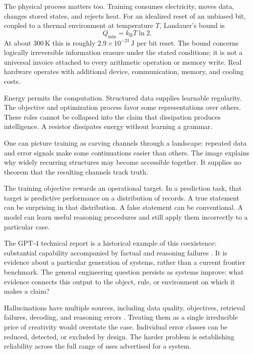The physical process matters too. Training consumes electricity, moves data, changes stored states, and rejects heat. For an idealized reset of an unbiased bit, coupled to a thermal environment at temperature $T$, Landauer's bound is
\begin{equation}
 Q_{\min}=k_{\mathrm B}T\ln 2.
\end{equation}
At about $300\,\mathrm{K}$ this is roughly $2.9\times10^{-21}\,\mathrm{J}$ per bit reset. The bound concerns logically irreversible information erasure under the stated conditions; it is not a universal invoice attached to every arithmetic operation or memory write. Real hardware operates with additional device, communication, memory, and cooling costs.

Energy permits the computation. Structured data supplies learnable regularity. The objective and optimization process favor some representations over others. These roles cannot be collapsed into the claim that dissipation produces intelligence. A resistor dissipates energy without learning a grammar.

One can picture training as carving channels through a landscape: repeated data and error signals make some continuations easier than others. The image explains why widely recurring structures may become accessible together. It supplies no theorem that the resulting channels track truth.

The training objective rewards an operational target. In a prediction task, that target is predictive performance on a distribution of records. A true statement can be surprising in that distribution. A false statement can be conventional. A model can learn useful reasoning procedures and still apply them incorrectly to a particular case.

The GPT-4 technical report is a historical example of this coexistence: substantial capability accompanied by factual and reasoning failures \cite{openai2023gpt4}. It is evidence about a particular generation of systems, rather than a current frontier benchmark. The general engineering question persists as systems improve: what evidence connects this output to the object, rule, or environment on which it makes a claim?

Hallucinations have multiple sources, including data quality, objectives, retrieval failures, decoding, and reasoning errors \cite{huang2023hallucination}. Treating them as a single irreducible price of creativity would overstate the case. Individual error classes can be reduced, detected, or excluded by design. The harder problem is establishing reliability across the full range of uses advertised for a system.

